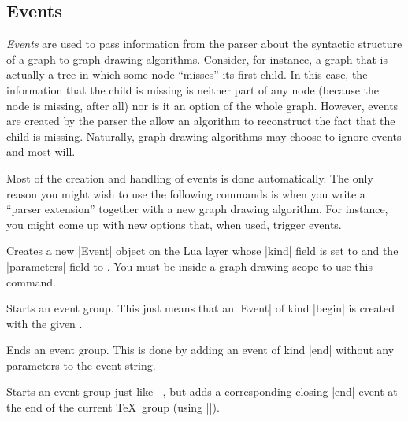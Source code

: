 \subsection{Events}
\label{section-gd-events}

\emph{Events} are used to pass information from the parser about the
syntactic structure of a graph to graph drawing algorithms. Consider,
for instance, a graph that is actually a tree in which some node
``misses'' its first child. In this case, the information that the
child is missing is neither part of any node (because the node is
missing, after all) nor is it an option of the whole graph. However,
events are created by the parser the allow an algorithm to reconstruct
the fact that the child is missing. Naturally, graph drawing
algorithms may choose to ignore events and most will.

Most of the creation and handling of events is done automatically. The
only reason you might wish to use the following commands is when you
write a ``parser extension'' together with a new graph drawing
algorithm. For instance, you might come up with new options that, when
used, trigger events.

\begin{command}{\pgfgdevent{}}
  Creates a new |Event| object on the Lua layer whose |kind| field is
  set to  and the |parameters| field to .
  You must be inside a graph drawing scope to use this command.
\end{command}

\begin{command}{\pgfgdbegineventgroup{}}
  Starts an event group. This just means that an |Event| of kind
  |begin| is created with the given .
\end{command}

\begin{command}{\pgfgdendeventgroup}
  Ends an event group. This is done by adding an event of kind |end|
  without any parameters to the event string.
\end{command}

\begin{command}{\pgfgdeventgroup{}}
  Starts an event group just like |\pgfgdbegineventgroup|, but adds a
  corresponding closing |end| event at the end of the current \TeX\
  group (using |\aftergroup|).
\end{command}